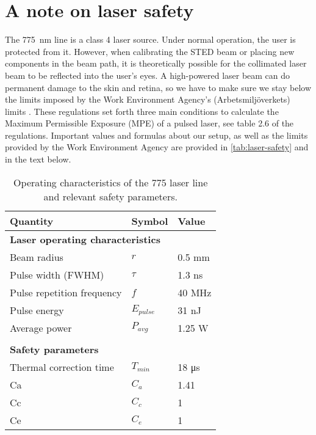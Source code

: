 
\chapter{A note on laser safety}

The \SI{775}{nm} line is a class 4 laser source. Under normal operation, the user is protected from it. However, when calibrating the STED beam or placing new components in the beam path, it is theoretically possible for the collimated laser beam to be reflected into the user's eyes. A high-powered laser beam can do permanent damage to the skin and retina, so we have to make sure we stay below the limits imposed by the Work Environment Agency's (Arbetsmiljöverkets) limits \cite{AFS2009:7}. These regulations set forth three main conditions to calculate the Maximum Permissible Exposure (MPE) of a pulsed laser, see table 2.6 of the regulations. Important values and formulas about our setup, as well as the limits provided by the Work Environment Agency are provided in \autoref{tab:laser-safety} and in the text below.

\begin{table}[h]
	\centering

	\begin{tabular}{lll}
		\toprule
		Quantity                   & Symbol               & Value                 \\ \midrule
		\multicolumn{3}{l}{\textbf{Laser operating characteristics}}              \\
		Beam radius                & $ r $                & 0.5 mm                \\
		Pulse width (FWHM)         & $ \tau $             & 1.3 ns                \\
		Pulse repetition frequency & $ f $                & 40 MHz                \\
		Pulse energy               & $ E_\mathit{pulse} $ & 31 nJ                 \\
		Average power              & $P_\mathit{avg} $    & 1.25 W                \\
		                           &  \\
		\multicolumn{3}{l}{\textbf{Safety parameters}}                            \\
		Thermal correction time    & $ T_\mathit{min} $   & 18 \si{\micro\second} \\
		Ca                         & $ C_a $              & 1.41                  \\
		Cc                         & $ C_c $              & 1                     \\
		Ce                         & $ C_e $              & 1                     \\ \bottomrule
	\end{tabular}	
	\caption{Operating characteristics of the 775 laser line and relevant safety parameters. }
	\label{tab:laser-safety}
\end{table}

